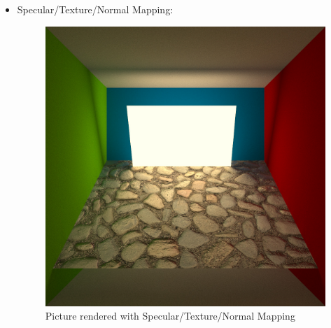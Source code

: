 \documentclass[11pt,a4paper]{article}
\begin{document}
\begin{itemize}
\item
Specular/Texture/Normal Mapping:\\
\begin{figure}[H]
\begin{center}
\includegraphics[scale=0.2]{images/bumbmapped1000spp}
\caption[Picture showing Specular/Texture/Normal Mapping]{Picture rendered with Specular/Texture/Normal Mapping}
\label{fig:5}
\end{center}
\end{figure}


\end{itemize}
\end{document}
